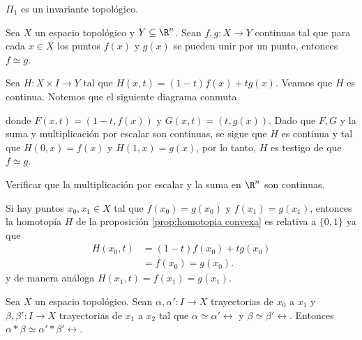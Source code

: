     \begin{coro}
        $\Pi_1$ es un invariante topológico.
    \end{coro}
    \begin{prop}
        \label{prop:homotopia convexa}
        Sea $X$ un espacio topológico y $Y\subseteq\R^n$. Sean $f,g:X\to Y$ continuas tal que para cada $x\in X$ los puntos $f(x)$ y $g(x)$ se pueden unir por un punto, entonces $f\simeq g$.
    \end{prop}
    \begin{dem}
        Sea $H:X\times I\to Y$ tal que $H(x,t)=(1-t)f(x)+tg(x).$ Veamos que $H$ es continua.
    Notemos que el siguiente diagrama conmuta
    \begin{center}
    \end{center}
    donde $F(x,t)=(1-t,f(x))$ y $G(x,t)=(t,g(x)).$ Dado que $F,G$ y la suma y multiplicación por escalar son continuas, se sigue que $H$ es continua y tal que $H(0,x)=f(x)$ y $H(1,x)=g(x)$, por lo tanto, $H$ es testigo de que $f\simeq g$.
    \end{dem}
    \begin{ejercicio}
        Verificar que la multiplicación por escalar y la suma en $\R^n$ son continuas.
    \end{ejercicio}
    \begin{nota}
    \label{nota:homotopia_convexa}
        Si hay puntos $x_0,x_1\in X$ tal que $f(x_0)=g(x_0)$ y $f(x_1)=g(x_1)$, entonces la homotopía $H$ de la proposición \ref{prop:homotopia convexa} es relativa a $\{0,1\}$ ya que 
        \begin{align*}
            H(x_0,t)&=(1-t)f(x_0)+tg(x_0)\\
            &=f(x_0)=g(x_0).
        \end{align*}
        y de manera análoga $H(x_1,t)=f(x_1)=g(x_1).$
    \end{nota}
    \begin{lema}
        Sea $X$ un espacio topológico. Sean
        $\alpha,\alpha':I\to X$ trayectorias de $x_0$ a $x_1$ y $\beta,\beta':I\to X$ trayectorias de $x_1$ a $x_2$ tal que $\alpha\simeq\alpha'\rel$ y $\beta\simeq\beta'\rel$. Entonces $\alpha*\beta\simeq \alpha'*\beta'\rel.$
    \end{lema}
